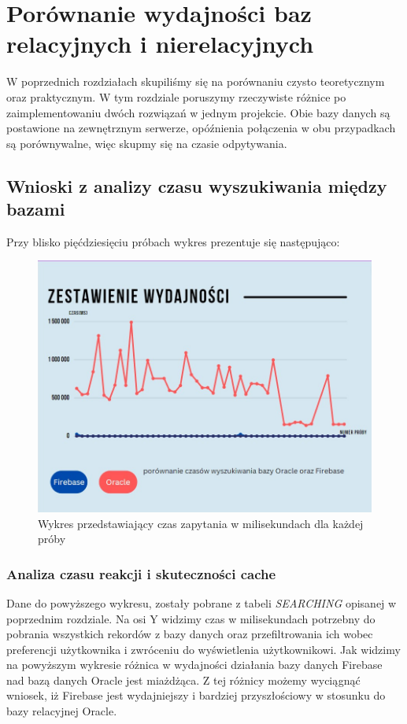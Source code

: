 \chapter{Porównanie wydajności baz relacyjnych i nierelacyjnych}

W poprzednich rozdziałach skupiliśmy się na porównaniu czysto teoretycznym oraz praktycznym. W tym rozdziale poruszymy rzeczywiste różnice po zaimplementowaniu dwóch rozwiązań w jednym projekcie. Obie bazy danych są postawione na zewnętrznym serwerze, opóźnienia połączenia w obu przypadkach są porównywalne, więc skupmy się na czasie odpytywania.

\section{Wnioski z analizy czasu wyszukiwania między bazami}
Przy blisko pięćdziesięciu próbach wykres prezentuje się następująco:
\begin{figure}[h]
    \centering
    \includegraphics[width=0.8\linewidth]{./img/wykres.jpg}
    \caption{Wykres przedstawiający czas zapytania w milisekundach dla każdej próby}
    \label{fig:Wykres}
\end{figure}

\subsection{Analiza czasu reakcji i skuteczności cache}
Dane do powyższego wykresu, zostały pobrane z tabeli \textit{SEARCHING} opisanej w poprzednim rozdziale. Na osi Y widzimy czas w milisekundach potrzebny do pobrania wszystkich rekordów z bazy danych oraz przefiltrowania ich wobec preferencji użytkownika i zwróceniu do wyświetlenia użytkownikowi. Jak widzimy na powyższym wykresie różnica w wydajności działania bazy danych Firebase nad bazą danych Oracle jest miażdżąca. Z tej różnicy możemy wyciągnąć wniosek, iż Firebase jest wydajniejszy i bardziej przyszłościowy w stosunku do bazy relacyjnej Oracle.

